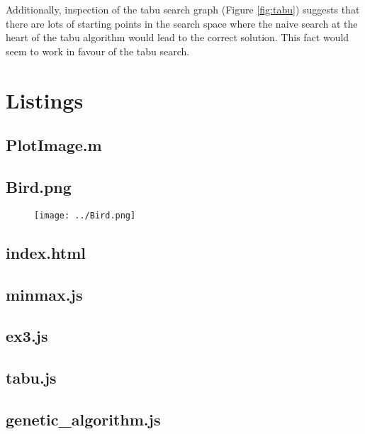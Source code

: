 \documentclass[a4paper,12pt]{article}
\begin{document}
Additionally, inspection of the tabu search graph (Figure \ref{fig:tabu}) suggests that there are lots of starting points in the search space where the naive search at the heart of the tabu algorithm would lead to the correct solution.
This fact would seem to work in favour of the tabu search. 

\newpage
\appendix

\section{Listings}
\subsection{PlotImage.m}



\subsection{Bird.png}

\begin{figure}[H]
\centering
\texttt{[image: ../Bird.png]}
\end{figure}

\subsection{index.html}



\subsection{minmax.js}



\subsection{ex3.js}



\subsection{tabu.js}



\subsection{genetic\_algorithm.js}


\end{document}
